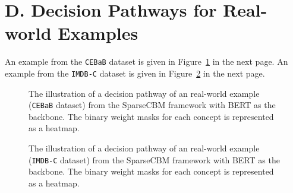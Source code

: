 \documentclass[letterpaper]{article} %
\begin{document}
\section{D. Decision Pathways for Real-world Examples}
An example from the \texttt{CEBaB} dataset is given in Figure~\ref{fig:example1} in the next page. An example from the \texttt{IMDB-C} dataset is given in Figure~\ref{fig:example2} in the next page.
\begin{figure}[htbp]
  \centering
  \caption{{The illustration of a decision pathway of an real-world example (\texttt{CEBaB} dataset) from the SparseCBM framework with BERT as the backbone. The binary weight masks for each concept is represented as a heatmap.}}\label{fig:example1}
\end{figure}

\begin{figure}[htbp]
  \centering
  \caption{{The illustration of a decision pathway of an real-world example (\texttt{IMDB-C} dataset) from the SparseCBM framework with BERT as the backbone. The binary weight masks for each concept is represented as a heatmap.}}\label{fig:example2}
\end{figure}
\end{document}
